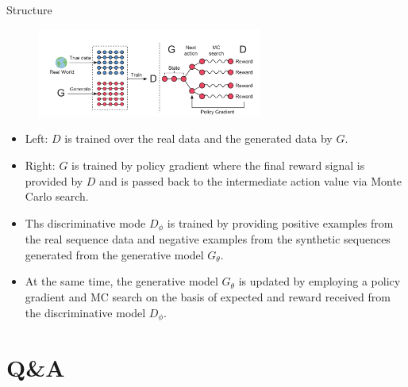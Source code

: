 \documentclass[10pt]{beamer}
\newcommand{\subtitlepage}[3]{\title{#1}\subtitle{#2}\author{#3}\date{}\begin{frame}[plain]\titlepage\end{frame}}
\begin{document}
	\begin{frame}{Structure}
		\begin{figure}
			\includegraphics[width=20em]{figures/SeqGAN-general-structure.png}
		\end{figure}
		\vspace{-1em}
		\begin{itemize}
			\pause
			\item Left: $D$ is trained over the real data and the generated data by $G$.
			\pause
			\item Right: $G$ is trained by policy gradient where the final reward signal is provided by $D$ and is passed back to the intermediate action value via Monte Carlo search.
			\pause
			\item Ths discriminative mode $D_\phi$ is trained by providing positive examples from the real sequence data and negative examples from the synthetic sequences generated from the generative model $G_\theta$.
			\pause
			\item At the same time, the generative model $G_\theta$ is updated by employing a policy gradient and MC search on the basis of expected and reward received from the discriminative model $D_\phi$.
		\end{itemize}
	\end{frame}

	\section{Q\&A}
	
\end{document}
